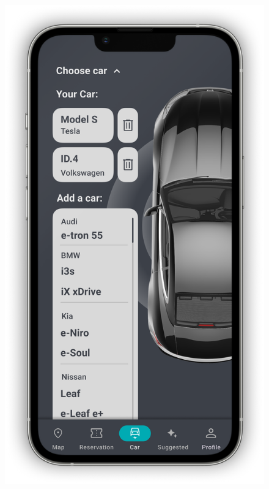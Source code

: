\begin{figure}[H]
{        \includegraphics[scale=0.32]{src/mockups/car_add.png}
    }
    \newline
\end{figure}

